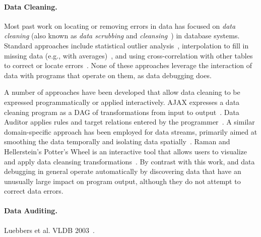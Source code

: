 
\paragraph{Data Cleaning.}
Most past work on locating or removing errors in data has focused
on \emph{data cleaning} (also known as \emph{data scrubbing}
and \emph{cleansing}~\cite{DBLP:journals/debu/RahmD00}) in database
systems. Standard approaches include statistical outlier
analysis~\cite{FIXME}, interpolation to fill in missing data (e.g.,
with averages)~\cite{FIXME}, and using cross-correlation with other
tables to correct or locate errors~\cite{FIXME}. None of these
approaches leverage the interaction of data with programs that operate
on them, as data debugging does.



A number of approaches have been developed that allow data cleaning to
be expressed programmatically or applied interactively. AJAX expresses
a data cleaning program as a DAG of transformations from input to
output~\cite{Galhardas:2000:AED:342009.336568}. Data Auditor applies
rules and target relations entered by the
programmer~\cite{Golab:2010:DAE:1920841.1921060}. A similar
domain-specific approach has been employed for data streams, primarily
aimed at smoothing the data temporally and isolating data
spatially~\cite{1617508}. Raman and Hellerstein's Potter's Wheel is an
interactive tool that allows users to visualize and apply data
cleansing transformations~\cite{Raman:2001:PWI:645927.672045}. By
contrast with this work, \checkcell{} and data debugging in general
operate automatically by discovering data that have an unusually large
impact on program output, although they do not attempt to correct data
errors.

\paragraph{Data Auditing.}
Luebbers et al. VLDB 2003~\cite{Luebbers:2003:SDD:1315451.1315499}.

